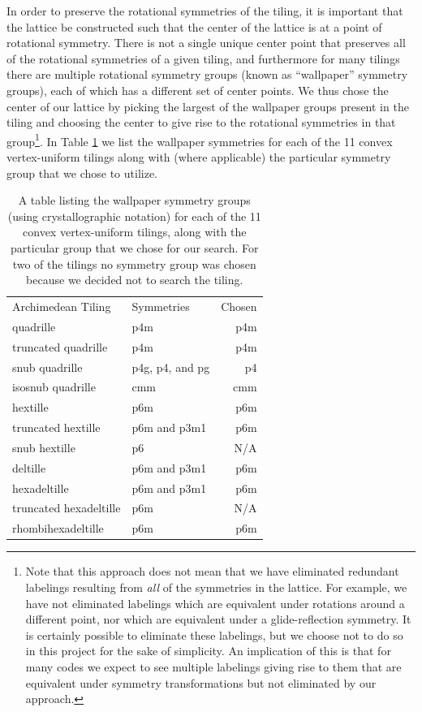 \documentclass[twocolumn,showpacs,preprintnumbers,amsmath,amssymb,nofootinbib,pra,floatfix]{revtex4-1}
\begin{document}
In order to preserve the rotational symmetries of the tiling, it is important that the lattice be constructed such that the center of the lattice is at a point of rotational symmetry.  There is not a single unique center point that preserves all of the rotational symmetries of a given tiling, and furthermore for many tilings there are multiple rotational symmetry groups (known as ``wallpaper'' symmetry groups), each of which has a different set of center points.  We thus chose the center of our lattice by picking the largest of the wallpaper groups present in the tiling and choosing the center to give rise to the rotational symmetries in that group\footnote{Note that this approach does not mean that we have eliminated redundant labelings resulting from \emph{all} of the symmetries in the lattice.  For example, we have not eliminated labelings which are equivalent under rotations around a different point, nor which are equivalent under a glide-reflection symmetry.  It is certainly possible to eliminate these labelings, but we choose not to do so in this project for the sake of simplicity.  An implication of this is that for many codes we expect to see multiple labelings giving rise to them that are equivalent under symmetry transformations but not eliminated by our approach.}.  In Table \ref{table:symmetries} we list the wallpaper symmetries for each of the 11 convex vertex-uniform tilings along with (where applicable) the particular symmetry group that we chose to utilize.

\begin{table}
\begin{tabular}{llr}
\toprule
Archimedean Tiling & Symmetries & Chosen\\
quadrille & p4m & p4m \\
truncated quadrille & p4m & p4m \\
snub quadrille & p4g, p4, and pg & p4 \\
isosnub quadrille & cmm & cmm \\
hextille & p6m & p6m \\
truncated hextille & p6m and p3m1 & p6m \\
snub hextille & p6 & N/A \\
deltille & p6m and p3m1 & p6m \\
hexadeltille & p6m and p3m1 & p6m \\
truncated hexadeltille & p6m & N/A \\
rhombihexadeltille & p6m & p6m \\
\bottomrule
\end{tabular}
\caption[Symmetry groups of the tilings]{
\label{table:symmetries}
A table listing the wallpaper symmetry groups (using crystallographic notation) for each of the 11 convex vertex-uniform tilings, along with the particular group that we chose for our search.  For two of the tilings no symmetry group was chosen because we decided not to search the tiling.
}
\end{table}
\end{document}
